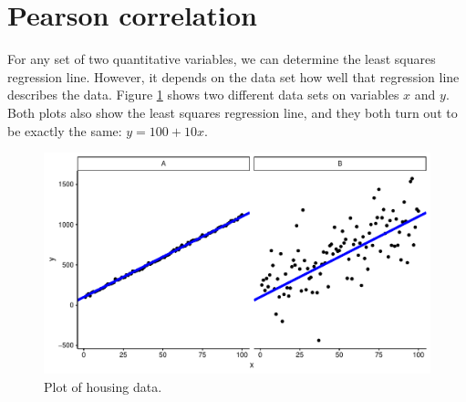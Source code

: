 \documentclass[]{book}\usepackage[]{graphicx}\usepackage[]{color}
\makeatletter
\def\maxwidth{ %
  \ifdim\Gin@nat@width>\linewidth
    \linewidth
  \else
    \Gin@nat@width
  \fi
}
\newenvironment{knitrout}{}{} %
\makeatother
\begin{document}
% 
% 
% 
% 
% 
% 
% 
% 





\section{Pearson correlation}

For any set of two quantitative variables, we can determine the least squares regression line. However, it depends on the data set how well that regression line describes the data. Figure \ref{fig:lm_18} shows two different data sets on variables $x$ and $y$. Both plots also show the least squares regression line, and they both turn out to be exactly the same: $y=100+10x$.

\begin{knitrout}
\color{fgcolor}\begin{figure}

{\centering \includegraphics[width=\maxwidth]{figure/lm_18-1} 

}

\caption[Plot of housing data]{Plot of housing data.}\label{fig:lm_18}
\end{figure}


\end{knitrout}
\end{document}
